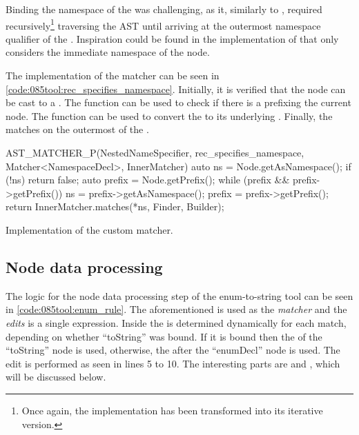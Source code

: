 Binding the namespace of the  was challenging, as it, similarly to , required recursively\footnote{
    Once again, the implementation has been transformed into its iterative version.
}
traversing the AST until arriving at the outermost namespace qualifier of the .
Inspiration could be found in the implementation of  that only considers the immediate namespace of the node.

The implementation of the matcher can be seen in \cref{code:085tool:rec_specifies_namespace}. Initially, it is verified that the node can be cast to a .
The function  can be used to check if there is a  prefixing the current node.
The function  can be used to convert the  to its underlying .
Finally, the  matches on the outermost  of the .

\begin{listing}[H]
    \begin{cppcode}
AST_MATCHER_P(NestedNameSpecifier, rec_specifies_namespace, Matcher<NamespaceDecl>, InnerMatcher) {
	auto ns = Node.getAsNamespace();
	if (!ns) {
		return false;
	}
	auto prefix = Node.getPrefix();
	while (prefix && prefix->getPrefix()) {
		ns = prefix->getAsNamespace();
		prefix = prefix->getPrefix();
	}
	return InnerMatcher.matches(*ns, Finder, Builder);
}
    \end{cppcode}
    \caption{Implementation of the  custom matcher.}
    \label{code:085tool:rec_specifies_namespace}
\end{listing}

\subsection{Node data processing}
The logic for the node data processing step of the enum-to-string tool can be seen in \cref{code:085tool:enum_rule}.
The aforementioned  is used as the \textit{matcher} and the \textit{edits} is a single  expression.
Inside  the  is determined dynamically for each match, depending on whether ``toString'' was bound. If it is bound then the  of the ``toString'' node is used, otherwise, the  after the ``enumDecl'' node is used.
The edit is performed as seen in lines 5 to 10. The interesting parts are  and , which will be discussed below.


